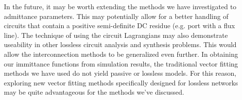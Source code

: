 In the future, it may be worth extending the methods we have investigated to admittance parameters. This may potentially allow for a better handling of circuits that contain a positive semi-definite DC residue (e.g. port with a flux line). The technique of using the circuit Lagrangians may also demonstrate useability in other lossless circuit analysis and synthesis problems. This would allow the interconnection methods to be generalized even further. In obtaining our immittance functions from simulation results, the traditional vector fitting methods we have used do not yield passive or lossless models. For this reason, exploring new vector fitting methods specifically designed for lossless networks may be quite advantageous for the methods we've discussed. 
